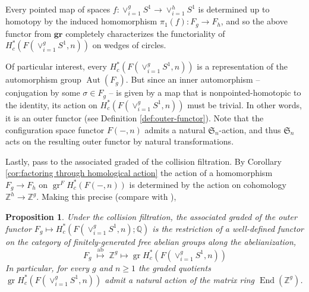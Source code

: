 \documentclass[12pt]{article}
\newcommand{\SymGroup}[1][n]{\mathfrak{S}_{#1}}
\DeclareMathOperator{\Aut}{Aut}
\DeclareMathOperator{\End}{End}
\DeclareMathOperator{\gr}{gr}
\theoremstyle{plain}
\newtheorem{prop}[thm]{Proposition}
\theoremstyle{definition}
\theoremstyle{remark}
\begin{document}

Every pointed map of spaces $f:\vee_{i=1}^g S^1 \to \vee_{i=1}^h S^1$ is determined up to homotopy by the induced homomorphism  $\pi_1(f): F_g\to F_h$, and so the above functor from $\mathbf{gr}$ completely characterizes the functoriality of $H^*_c( F(\vee_{i=1}^g S^1,n))$ on wedges of circles.

Of particular interest, every $H^*_c( F(\vee_{i=1}^g S^1,n))$ is a representation of the automorphism group $\Aut(F_g)$. But since an inner automorphism -- conjugation by some $\sigma\in F_g$ -- is given by a map that is nonpointed-homotopic to the identity, its action on $H^*_c( F(\vee_{i=1}^g S^1,n))$ must be trivial. In other words, it is an outer functor (see Definition \ref{def:outer-functor}).
Note that the configuration space functor  $F(-,n)$ admits a natural $\SymGroup$-action, and thus $\SymGroup$ acts on the resulting outer functor by natural transformations.

Lastly, pass to the associated graded of the collision filtration. By Corollary \ref{cor:factoring through homological action} the action of a homomorphism $F_g\to F_h$ on $\gr^F H^*_c( F(-,n))$ is determined by the action on cohomology $\mathbb{Z}^h \to \mathbb{Z}^g$. Making this precise (compare with \cite[Theorems 6.9, 17.8]{PV18}),

\begin{prop}\label{prop:GL action after grading}
Under the collision filtration, the associated graded of the outer functor $F_g \mapsto H^*_c( F(\vee_{i=1}^g S^1,n) ; \mathbb{Q})$ 
is the restriction of a well-defined functor on the category of finitely-generated free abelian groups along the abelianization,
\begin{equation}\label{eq:free-group-polynomial-functor}
    F_g \;\overset{\operatorname{ab}}{\longmapsto} \; \mathbb{Z}^g \longmapsto \gr H^*_c( F(\vee_{i=1}^g S^1,n))
\end{equation}
In particular, for every $g$ and $n\geq 1$ the graded quotients $\gr H^*_c( F(\vee_{i=1}^g S^1,n))$ admit a natural action of the matrix ring $\End(\mathbb{Z}^g)$.
\end{prop}
\end{document}
